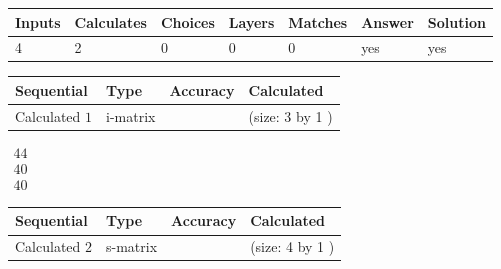\documentclass[12pt]{article}
\begin{document}
 
 
\noindent{}
 
 

 
 
 
\noindent{}
 
 

 
 
\noindent{}
 
 

 
\vspace{0.3in}
   
   
   
   
\noindent\begin{tabular}{|l|l|l|l|l|l|l|}
 \hline
Inputs & Calculates & Choices & Layers & Matches & Answer & Solution \\ \hline
           4  & 
           2  & 
           0
  & 
           0  & 
           0  & 
  yes & 
  yes 
  \\ \hline
 \end{tabular}
   
   
   
   
\noindent{}
   
   
  
  
\noindent\begin{tabular}{|l|l|l|l|}
\hline
 Sequential & Type & Accuracy & Calculated \\ 
\hline
 
 
  Calculated $            1 $ & i-matrix &  & 
 (size:            3  by            1 )
 \\  \hline  
 \end{tabular}
   
   
$\begin{array}{
 c
 }
          44  \\ 
          40  \\ 
          40
 \end{array}  $ 
  
  
\noindent\begin{tabular}{|l|l|l|l|}
\hline
 Sequential & Type & Accuracy & Calculated \\ 
\hline
 
 
  Calculated $            2 $ & s-matrix & & 
 (size:            4  by            1 )
 \\  \hline  
 \end{tabular}
   
\end{document}
